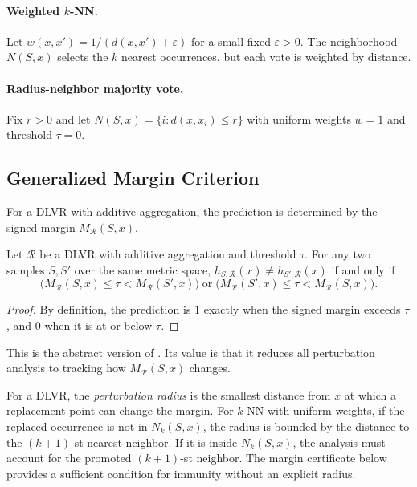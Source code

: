 \paragraph{Weighted $k$-NN.}
Let $w(x,x') = 1/(d(x,x') + \varepsilon)$ for a small fixed $\varepsilon > 0$.
The neighborhood $N(S,x)$ selects the $k$ nearest occurrences, but each vote
is weighted by distance.

\paragraph{Radius-neighbor majority vote.}
Fix $r > 0$ and let $N(S,x) = \{i : d(x, x_i) \le r\}$ with uniform weights
$w=1$ and threshold $\tau=0$.

\subsection{Generalized Margin Criterion}

For a DLVR with additive aggregation, the prediction is determined by
the signed margin $M_{\mathcal{R}}(S, x)$.

\begin{proposition}
\label{prop:generalized-margin}
Let $\mathcal{R}$ be a DLVR with additive aggregation and threshold $\tau$.
For any two samples $S, S'$ over the same metric space,
$h_{S,\mathcal{R}}(x) \neq h_{S',\mathcal{R}}(x)$
if and only if
\[
\big(M_{\mathcal{R}}(S, x) \le \tau < M_{\mathcal{R}}(S', x)\big)
\;\text{or}\;
\big(M_{\mathcal{R}}(S', x) \le \tau < M_{\mathcal{R}}(S, x)\big).
\]
\end{proposition}

\begin{proof}
By definition, the prediction is $1$ exactly when the signed margin exceeds
$\tau$, and $0$ when it is at or below $\tau$.
\end{proof}

This is the abstract version of . Its value is that it reduces
all perturbation analysis to tracking how $M_{\mathcal{R}}(S, x)$ changes.

\begin{remark}
\label{rem:perturbation-radius}
For a DLVR, the {\em perturbation radius} is the smallest distance from $x$ at
which a replacement point can change the margin. For $k$-NN with uniform
weights, if the replaced occurrence is not in $N_k(S,x)$, the radius is
bounded by the distance to the $(k+1)$-st nearest neighbor. If it is inside
$N_k(S,x)$, the analysis must account for the promoted $(k+1)$-st neighbor.
The margin certificate below provides a sufficient condition for immunity
without an explicit radius.
\end{remark}

